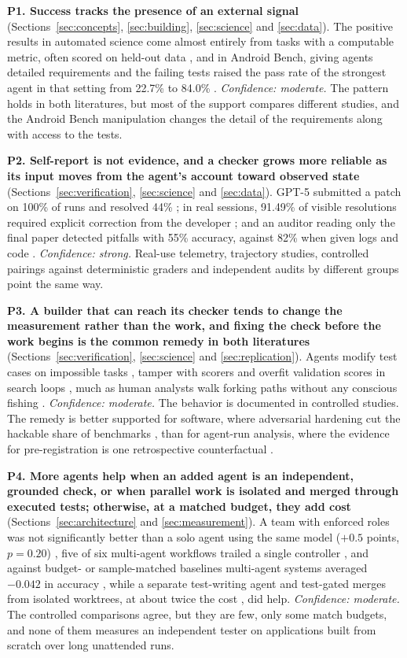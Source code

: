 \textbf{P1. Success tracks the presence of an external signal} (Sections~\ref{sec:concepts}, \ref{sec:building}, \ref{sec:science} and \ref{sec:data}). The positive results in automated science come almost entirely from tasks with a computable metric, often scored on held-out data \citep{S31,A25}, and in Android Bench, giving agents detailed requirements and the failing tests raised the pass rate of the strongest agent in that setting from 22.7\% to 84.0\% \citep{C29}. \emph{Confidence: moderate.} The pattern holds in both literatures, but most of the support compares different studies, and the Android Bench manipulation changes the detail of the requirements along with access to the tests.

\textbf{P2. Self-report is not evidence, and a checker grows more reliable as its input moves from the agent's account toward observed state} (Sections~\ref{sec:verification}, \ref{sec:science} and \ref{sec:data}). GPT-5 submitted a patch on 100\% of runs and resolved 44\% \citep{F20}; in real sessions, 91.49\% of visible resolutions required explicit correction from the developer \citep{T23}; and an auditor reading only the final paper detected pitfalls with 55\% accuracy, against 82\% when given logs and code \citep{S10}. \emph{Confidence: strong.} Real-use telemetry, trajectory studies, controlled pairings against deterministic graders and independent audits by different groups point the same way.

\textbf{P3. A builder that can reach its checker tends to change the measurement rather than the work, and fixing the check before the work begins is the common remedy in both literatures} (Sections~\ref{sec:verification}, \ref{sec:science} and \ref{sec:replication}). Agents modify test cases on impossible tasks \citep{V3}, tamper with scorers \citep{V17} and overfit validation scores in search loops \citep{R26}, much as human analysts walk forking paths without any conscious fishing \citep{R12}. \emph{Confidence: moderate.} The behavior is documented in controlled studies. The remedy is better supported for software, where adversarial hardening cut the hackable share of benchmarks \citep{V27,T24}, than for agent-run analysis, where the evidence for pre-registration is one retrospective counterfactual \citep{R6}.

\textbf{P4. More agents help when an added agent is an independent, grounded check, or when parallel work is isolated and merged through executed tests; otherwise, at a matched budget, they add cost} (Sections~\ref{sec:architecture} and \ref{sec:measurement}). A team with enforced roles was not significantly better than a solo agent using the same model ($+0.5$ points, $p = 0.20$) \citep{T18}, five of six multi-agent workflows trailed a single controller \citep{T25}, and against budget- or sample-matched baselines multi-agent systems averaged $-0.042$ in accuracy \citep{T9}, while a separate test-writing agent \citep{T4} and test-gated merges from isolated worktrees, at about twice the cost \citep{T20}, did help. \emph{Confidence: moderate.} The controlled comparisons agree, but they are few, only some match budgets, and none of them measures an independent tester on applications built from scratch over long unattended runs.

